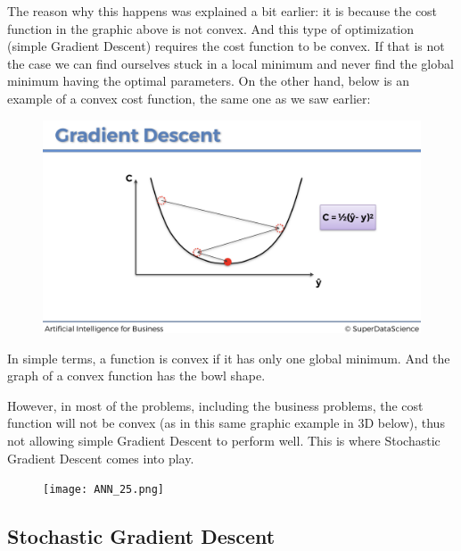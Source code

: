 \documentclass[]{book}
\begin{document}
\newpage

The reason why this happens was explained a bit earlier: it is because the cost function in the graphic above is not convex. And this type of optimization (simple Gradient Descent) requires the cost function to be convex. If that is not the case we can find ourselves stuck in a local minimum and never find the global minimum having the optimal parameters. On the other hand, below is an example of a convex cost function, the same one as we saw earlier:

\begin{figure}[!htbp]
        \begin{center}
            \includegraphics[scale=0.18]{ANN_23.png}
        \end{center}
\end{figure}

In simple terms, a function is convex if it has only one global minimum. And the graph of a convex function has the bowl shape.

However, in most of the problems, including the business problems, the cost function will not be convex (as in this same graphic example in 3D below), thus not allowing simple Gradient Descent to perform well. This is where Stochastic Gradient Descent comes into play.

\begin{figure}[!htbp]
        \begin{center}
            \texttt{[image: ANN\_25.png]}
        \end{center}
\end{figure}

\subsection{Stochastic Gradient Descent}
\end{document}
